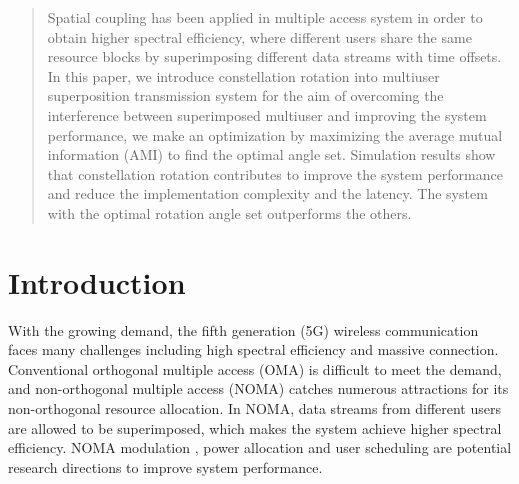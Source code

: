 \documentclass[conference]{IEEEtran}
\begin{document}
\maketitle

\begin{abstract}
Spatial coupling has been applied in multiple access system in order to obtain higher spectral efficiency, where different users share the same resource blocks by superimposing different data streams with time offsets. In this paper, we introduce constellation rotation into multiuser superposition transmission system for the aim of overcoming the interference between superimposed multiuser and improving the system performance, we make an optimization by maximizing the average mutual information (AMI) to find the optimal angle set. Simulation results show that constellation rotation contributes to improve the system performance and reduce the implementation complexity and the latency. The system with the optimal rotation angle set outperforms the others.
\end{abstract}





%
\IEEEpeerreviewmaketitle



\section{Introduction}

With the growing demand, the fifth generation (5G) wireless communication faces many challenges including high spectral efficiency and massive connection. Conventional orthogonal multiple access (OMA) is difficult to meet the demand, and non-orthogonal multiple access (NOMA) \cite{1} catches numerous attractions for its non-orthogonal resource allocation. In NOMA, data streams from different users are allowed to be superimposed, which makes the system achieve higher spectral efficiency. NOMA modulation \cite{2}, power allocation and user scheduling \cite{3} are potential research directions to improve system performance.
\end{document}

